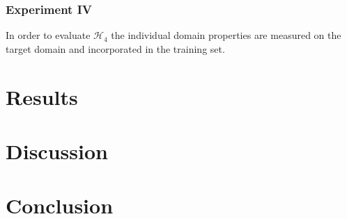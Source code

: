\subsubsection{Experiment IV}

In order to evaluate $\mathcal{H}_4$ the individual domain properties are measured on the target domain and incorporated in the training set.


\section{Results}
\label{sec:training:results}

\section{Discussion}
\label{sec:training:discussion}

\section{Conclusion}
\label{sec:training:conclusion}


